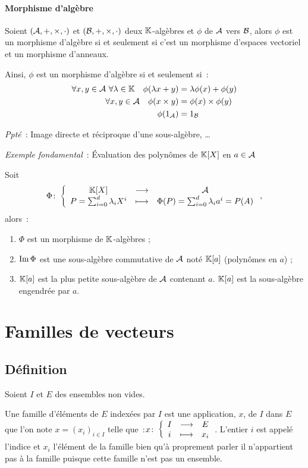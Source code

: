 \paragraph{Morphisme d'algèbre}
\begin{defdef}
	Soient  $(\mathcal{A},+,\times,\cdot)$ et $(\mathcal{B},+,\times,\cdot)$ deux $\mathbb{K}$-algèbres et $\phi$ de $\mathcal{A}$ vers $\mathcal{B}$, alors $\phi$ est un morphisme d'algèbre si et seulement si c'est un morphisme d'espaces vectoriel et un morphisme d'anneaux.
\end{defdef}
Ainsi, $\phi$ est un morphisme d'algèbre si et seulement si~:
\begin{align}
	\forall x,y \in \mathcal{A} \ \forall \lambda \in \mathbb{K} \quad \phi(\lambda x+y) &= \lambda\phi(x)+\phi(y) \\
	\forall x,y \in \mathcal{A} \quad \phi(x \times y) &= \phi(x) \times \phi(y) \\
	\phi(1_{\mathcal{A}}) &= 1_{\mathcal{B}}
\end{align}

\emph{Ppté}~: Image directe et réciproque d'une sous-algèbre, \ldots

\emph{Exemple fondamental}~: Évaluation des polynômes de $\mathbb{K}[X]$ en $a \in \mathcal{A}$
\begin{prop}
	Soit 
	\begin{equation}
		\Phi\colon \left\{\begin{array}{ccc} \mathbb{K}[X] & \longrightarrow &\mathcal{A}\\ P = \sum_{i=0}^d \lambda_i X^i & \longmapsto & \Phi(P) = \sum_{i=0}^d\lambda_i a^i=P(A) \end{array} \right.,
	\end{equation} 
	alors~:
	\begin{enumerate}
		\item $\Phi$ est un morphisme de $\mathbb{K}$-algèbres ;
		\item $\operatorname{Im}{\Phi}$ est une sous-algèbre commutative de $\mathcal{A}$ noté $\mathbb{K}[a]$ (polynômes en $a$) ;
		\item $\mathbb{K}[a]$ est la plus petite sous-algèbre de $\mathcal{A}$ contenant $a$. $\mathbb{K}[a]$ est la sous-algèbre engendrée par $a$.
	\end{enumerate}
\end{prop}

\section{Familles de vecteurs}
\subsection{Définition}
Soient $I$ et $E$ des ensembles non vides.

Une famille d'éléments de $E$ indexées par $I$ est une application, $x$, de $I$ dans $E$ que l'on note $x=(x_i)_{i \in I}$ telle que~:$x\colon \left\{\begin{array}{ccc} I & \longrightarrow &E\\ i & \longmapsto & x_i \end{array} \right.$. L'entier $i$  est appelé l'indice et $x_i$ l'élément de la famille bien qu'à proprement parler il n'appartient pas à la famille puisque cette famille n'est pas un ensemble.

